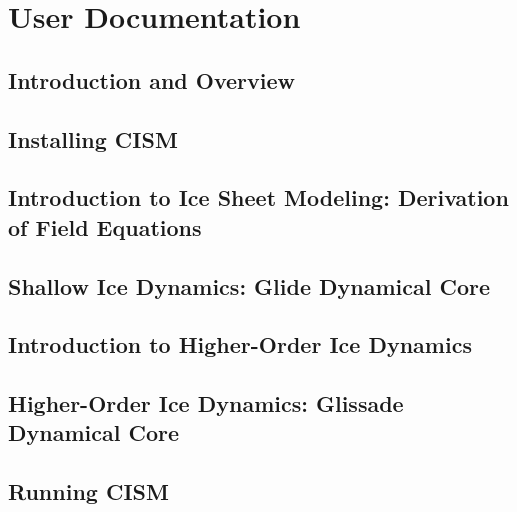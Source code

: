 \mainmatter
\part{User Documentation}

\chapter{Introduction and Overview}
\newcommand{\dir}{intro}


\chapter{Installing CISM}
\label{chp:install}
\renewcommand{\dir}{install}


\chapter{Introduction to Ice Sheet Modeling: Derivation of Field Equations}
\renewcommand{\dir}{modeling-intro}


\chapter{Shallow Ice Dynamics: Glide Dynamical Core}
\renewcommand{\dir}{shallow-ice}


\chapter{Introduction to Higher-Order Ice Dynamics}
\renewcommand{\dir}{higher-order}


\chapter{Higher-Order Ice Dynamics: Glissade Dynamical Core}
\renewcommand{\dir}{glissade}


%

\chapter{Running CISM}
\renewcommand{\dir}{run_cism}


